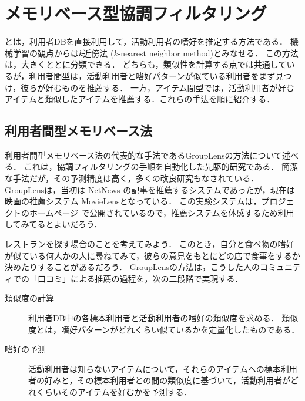 \chapter{メモリベース型協調フィルタリング}
\label{sec:memory-based}

とは，利用者DBを直接利用して，活動利用者の嗜好を推定する方法である．
機械学習の観点からは$k$近傍法 ($k$-nearest neighbor method)とみなせる．
この方法は，大きくととに分類できる．
どちらも，類似性を計算する点では共通しているが，利用者間型は，活動利用者と嗜好パターンが似ている利用者をまず見つけ，彼らが好むものを推薦する．
一方，アイテム間型では，活動利用者が好むアイテムと類似したアイテムを推薦する．これらの手法を順に紹介する．

\section{利用者間型メモリベース法}
\label{sec:user-user}

利用者間型メモリベース法の代表的な手法であるGroupLensの方法\cite{cscw:94:01}について述べる．
これは，協調フィルタリングの手順を自動化した先駆的研究である．
簡潔な手法だが，その予測精度は高く，多くの改良研究もなされている．
GroupLensは，当初は NetNews の記事を推薦するシステムであったが，現在は映画の推薦システム MovieLensとなっている．
この実験システムは，プロジェクトのホームページ\cite{url:008} で公開されているので，推薦システムを体感するため利用してみてるとよいだろう．

レストランを探す場合のことを考えてみよう．
このとき，自分と食べ物の嗜好が似ている何人かの人に尋ねてみて，彼らの意見をもとにどの店で食事をするか決めたりすることがあるだろう．
GroupLensの方法は，こうした人のコミュニティでの「口コミ」による推薦の過程を，次の二段階で実現する．
\begin{description}
 \item[類似度の計算]
 利用者DB中の各標本利用者と活動利用者の嗜好の類似度を求める．
 類似度とは，嗜好パターンがどれくらい似ているかを定量化したものである．
 \item[嗜好の予測]
 活動利用者は知らないアイテムについて，それらのアイテムへの標本利用者の好みと，その標本利用者との間の類似度に基づいて，活動利用者がどれくらいそのアイテムを好むかを予測する．
\end{description}

